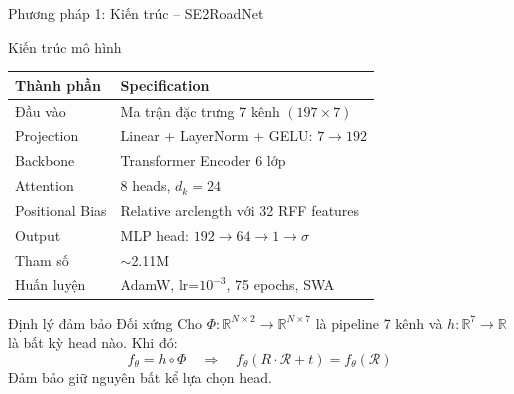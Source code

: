 \documentclass[aspectratio=169,10pt]{beamer}
\begin{document}
\begin{frame}{Phương pháp 1: Kiến trúc -- SE2RoadNet}
\begin{block}{Kiến trúc mô hình}
\scriptsize
\begin{center}
\begin{tabular}{l l}
\toprule
\textbf{Thành phần} & \textbf{Specification} \\
\midrule
Đầu vào & Ma trận đặc trưng 7 kênh $(197 \times 7)$ \\
Projection & Linear + LayerNorm + GELU: $7 \to 192$ \\
Backbone & Transformer Encoder 6 lớp \\
Attention & 8 heads, $d_k = 24$ \\
Positional Bias & Relative arclength với 32 RFF features \\
Output & MLP head: $192 \to 64 \to 1 \to \sigma$ \\
\midrule
Tham số & $\sim$2.11M \\
Huấn luyện & AdamW, lr=$10^{-3}$, 75 epochs, SWA \\
\bottomrule
\end{tabular}
\end{center}
\end{block}

\begin{block}{Định lý đảm bảo Đối xứng}
\scriptsize
Cho $\Phi: \mathbb{R}^{N \times 2} \to \mathbb{R}^{N \times 7}$ là pipeline 7 kênh và $h: \mathbb{R}^7 \to \mathbb{R}$ là bất kỳ head nào. Khi đó:
\[
f_\theta = h \circ \Phi \quad \Longrightarrow \quad f_\theta(R \cdot \mathcal{R} + t) = f_\theta(\mathcal{R})
\]
\alert{Đảm bảo giữ nguyên bất kể lựa chọn head.}
\end{block}
\end{frame}
\end{document}
